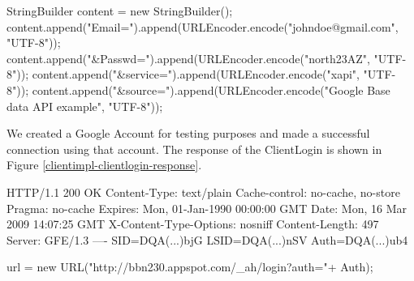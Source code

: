 \begin{figure*}[ht] %
\begin{center}
\begin{code}
StringBuilder content = new StringBuilder();
content.append("Email=").append(URLEncoder.encode("johndoe@gmail.com", "UTF-8"));
content.append("&Passwd=").append(URLEncoder.encode("north23AZ", "UTF-8"));
content.append("&service=").append(URLEncoder.encode("xapi", "UTF-8"));
content.append("&source=").append(URLEncoder.encode("Google Base data API example", 
  "UTF-8"));
\end{code}
\caption{Preparing our ClientLogin credentials.\label{clientimpl-clientlogin}}
\end{center}
\end{figure*}

We created a Google Account for testing purposes and made a successful connection
using that account. The response of the ClientLogin is shown in Figure
\ref{clientimpl-clientlogin-response}.

\begin{figure*}[ht] %
\begin{center}
\begin{code}
HTTP/1.1 200 OK
Content-Type: text/plain
Cache-control: no-cache, no-store
Pragma: no-cache
Expires: Mon, 01-Jan-1990 00:00:00 GMT
Date: Mon, 16 Mar 2009 14:07:25 GMT
X-Content-Type-Options: nosniff
Content-Length: 497
Server: GFE/1.3
----
SID=DQA(...)bjG
LSID=DQA(...)nSV
Auth=DQA(...)ub4
\end{code}
\caption{A response from ClientLogin.\label{clientimpl-clientlogin-response}}
\end{center}
\end{figure*}


\begin{figure*}[ht] %
\begin{center}
\begin{code}
url = new URL("http://bbn230.appspot.com/_ah/login?auth="+ Auth);
\end{code}
\caption{Logging In for a Session Cookie.\label{clientimpl-aelogin}}
\end{center}
\end{figure*}

